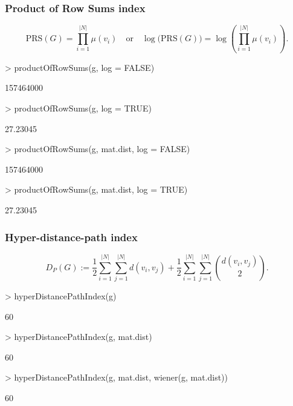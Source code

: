 \documentclass[a4paper]{article}
\begin{document}
\subsubsection*{Product of Row Sums index}
\begin{equation}
\text{PRS}(G)= \prod_{i=1}^{|N|} \mu(v_i) \quad \mbox{or} \quad   \log \big(\text{PRS}(G)\big)= \log\left( \prod_{i=1}^{|N|} \mu(v_i) \right).
\end{equation}

\begin{Schunk}
\begin{Sinput}
> productOfRowSums(g, log = FALSE)
\end{Sinput}
\begin{Soutput}
[1] 157464000
\end{Soutput}
\begin{Sinput}
> productOfRowSums(g, log = TRUE)
\end{Sinput}
\begin{Soutput}
[1] 27.23045
\end{Soutput}
\begin{Sinput}
> productOfRowSums(g, mat.dist, log = FALSE)
\end{Sinput}
\begin{Soutput}
[1] 157464000
\end{Soutput}
\begin{Sinput}
> productOfRowSums(g, mat.dist, log = TRUE)
\end{Sinput}
\begin{Soutput}
[1] 27.23045
\end{Soutput}
\end{Schunk}
\subsubsection*{Hyper-distance-path index}
\begin{equation}
D_P(G):= \frac{1}{2} \sum_{i=1}^{|N|} \sum_{j=1}^{|N|} d(v_i,v_j) +  \frac{1}{2} \sum_{i=1}^{|N|} \sum_{j=1}^{|N|}  {d(v_i,v_j) \choose 2}.
\end{equation}

\begin{Schunk}
\begin{Sinput}
> hyperDistancePathIndex(g)
\end{Sinput}
\begin{Soutput}
[1] 60
\end{Soutput}
\begin{Sinput}
> hyperDistancePathIndex(g, mat.dist)
\end{Sinput}
\begin{Soutput}
[1] 60
\end{Soutput}
\begin{Sinput}
> hyperDistancePathIndex(g, mat.dist, wiener(g, mat.dist))
\end{Sinput}
\begin{Soutput}
[1] 60
\end{Soutput}
\end{Schunk}
\end{document}
